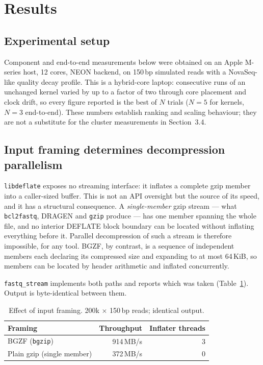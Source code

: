 \section{Results}

\subsection{Experimental setup}

Component and end-to-end measurements below were obtained on an Apple
M-series host, 12 cores, NEON backend, on 150\,bp simulated reads with a
NovaSeq-like quality decay profile. This is a hybrid-core laptop: consecutive
runs of an unchanged kernel varied by up to a factor of two through core
placement and clock drift, so every figure reported is the best of $N$ trials
($N=5$ for kernels, $N=3$ end-to-end). These numbers establish ranking and
scaling behaviour; they are not a substitute for the cluster measurements in
Section~3.4.

\subsection{Input framing determines decompression parallelism}

\texttt{libdeflate} exposes no streaming interface: it inflates a complete gzip
member into a caller-sized buffer. This is not an API oversight but the source
of its speed, and it has a structural consequence. A \emph{single-member} gzip
stream --- what \texttt{bcl2fastq}, DRAGEN and \texttt{gzip} produce --- has one
member spanning the whole file, and no interior DEFLATE block boundary can be
located without inflating everything before it. Parallel decompression of such
a stream is therefore impossible, for any tool. BGZF, by contrast, is a
sequence of independent members each declaring its compressed size and
expanding to at most 64\,KiB, so members can be located by header arithmetic
and inflated concurrently.

\texttt{fastq\_stream} implements both paths and reports which was taken
(Table~\ref{tab:framing}). Output is byte-identical between them.

\begin{table}[h]
\centering
\caption{Effect of input framing. 200k $\times$ 150\,bp reads; identical output.}
\label{tab:framing}
\small
\begin{tabular}{lrr}
\toprule
Framing & Throughput & Inflater threads \\
\midrule
BGZF (\texttt{bgzip}) & 914\,MB/s & 3 \\
Plain gzip (single member) & 372\,MB/s & 0 \\
\bottomrule
\end{tabular}
\end{table}

